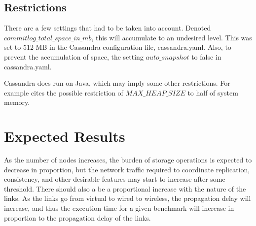 



\subsection{Restrictions}

There are a few settings that had to be taken into account.
Denoted $commitlog\_total\_space\_in\_mb$, this will accumulate to an undesired level.
This was set to 512 MB in the Cassandra configuration file, cassandra.yaml.
Also, to prevent the accumulation of space, the setting $auto\_snapshot$ to false in cassandra.yaml.

Cassandra does run on Java, which may imply some other restrictions.
For example \cite{DatastaxTuningResources} cites the possible restriction of $MAX\_HEAP\_SIZE$ to half of system memory. 


\section{Expected Results}

As the number of nodes increases, the burden of storage operations is expected to decrease in proportion, but the network traffic required to coordinate replication, consistency, and other desirable features may start to increase after some threshold.
There should also a be a proportional increase with the nature of the links.  As the links go from virtual to wired to wireless, the propagation delay will increase, and thus the execution time for a given benchmark will increase in proportion to the propagation delay of the links.

